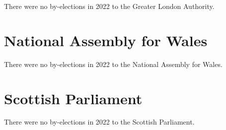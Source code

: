 \documentclass[a4paper,openany]{book}
\begin{document}
There were no by-elections in 2022 to the Greater London Authority.


\section{National Assembly for Wales}

There were no by-elections in 2022 to the National Assembly for Wales.


\section{Scottish Parliament}

There were no by-elections in 2022 to the Scottish Parliament.

%
%
%

%
%
\end{document}

